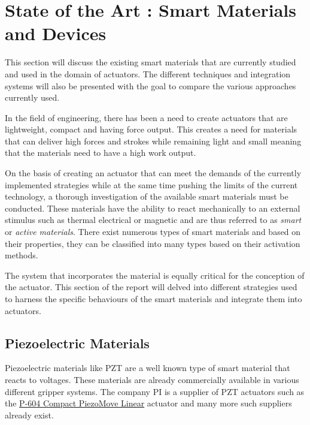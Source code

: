 \section{State of the Art : Smart Materials and Devices} \label{sec:sota}
This section will discuss the existing smart materials that are currently studied and used in the domain of actuators. The different techniques and integration systems will also be presented with the goal to compare the various approaches currently used.

In the field of engineering, there has been a need  to create actuators that are lightweight, compact and having force output. This creates a need for materials that can deliver high forces and strokes while remaining light and small meaning that the materials need to have a high work output.

On the basis of creating an actuator that can meet the demands of the currently implemented strategies while at the same time pushing the limits of the current technology, a thorough investigation of the available smart materials must be conducted. These materials have the ability to react mechanically to an external stimulus such as thermal electrical or magnetic and are thus referred to as \emph{smart} or \emph{active materials}. There exist numerous types of smart materials and based on their properties, they can be classified into many types based on their activation methods\cite{damodharan_review_2018}.

The system that incorporates the material is equally critical for the conception of the actuator. This section of the report will delved into different strategies used to harness the specific behaviours of the smart materials and integrate them into actuators.

\subsection{Piezoelectric Materials}
Piezoelectric materials like PZT are a well known type of smart material that reacts to voltages. These materials are already commercially available in various different gripper systems. The company PI is a supplier of PZT actuators such as the \href{https://www.physikinstrumente.com/en/products/piezoceramic-actuators/linear-actuators/p-604-compact-piezomove-linear-actuator-202820/}{P-604 Compact PiezoMove Linear} actuator and many more such suppliers already exist.

